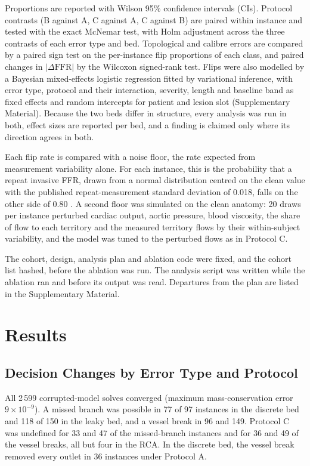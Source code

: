 \documentclass[journal]{IEEEtran}
\begin{document}
Proportions are reported with Wilson 95\% confidence intervals (CIs). Protocol contrasts (B against A, C against A,
C against B) are paired within instance and tested with the exact McNemar test, with Holm adjustment across the
three contrasts of each error type and bed. Topological and calibre errors are compared by a paired sign test on
the per-instance flip proportions of each class, and paired changes in $|\Delta\mathrm{FFR}|$ by the Wilcoxon
signed-rank test. Flips were also modelled by a Bayesian mixed-effects logistic regression fitted by variational
inference, with error type, protocol and their interaction, severity, length and baseline band as fixed effects and
random intercepts for patient and lesion slot (Supplementary Material). Because the two beds differ in structure,
every analysis was run in both, effect sizes are reported per bed, and a finding is claimed only where its
direction agrees in both.

Each flip rate is compared with a noise floor, the rate expected from measurement variability alone. For each instance, this is the probability that a repeat invasive FFR, drawn from a normal
distribution centred on the clean value with the published repeat-measurement standard deviation of 0.018, falls on
the other side of 0.80 \cite{johnson2015,petraco2013}. A second floor was simulated on the clean anatomy: 20 draws
per instance perturbed cardiac output, aortic pressure, blood viscosity, the share of flow to each territory and the
measured territory flows by their within-subject variability, and the model was tuned to the perturbed flows as in
Protocol C.

The cohort, design, analysis plan and ablation code were fixed, and the cohort list hashed, before the ablation was
run. The analysis script was written while the ablation ran and before its output was read. Departures from the
plan are listed in the Supplementary Material.

\section{Results}
\subsection{Decision Changes by Error Type and Protocol}
All 2\,599 corrupted-model solves converged (maximum mass-conservation error $9\times10^{-9}$). A missed branch
was possible in 77 of 97 instances in the discrete bed and 118
of 150 in the leaky bed, and a vessel break in 96 and 149. Protocol C was undefined for 33 and 47 of the
missed-branch instances and for 36 and 49 of the vessel breaks, all but four in the RCA. In the discrete bed, the
vessel break removed every outlet in 36 instances under Protocol A.
\end{document}
